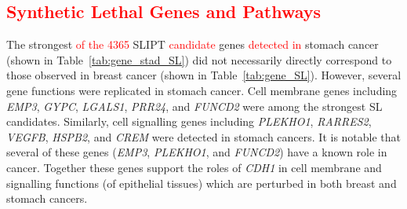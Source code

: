 \subsection{\textcolor{red}{Synthetic Lethal Genes and Pathways}} \label{chapt3:stad_SL_genes}

The strongest \textcolor{red}{of the 4365} \gls{SLIPT} \textcolor{red}{candidate} genes \textcolor{red}{detected in} stomach cancer (shown in Table~\ref{tab:gene_stad_SL}) did not necessarily directly correspond to those observed in breast cancer (shown in Table~\ref{tab:gene_SL}). However, several gene functions were replicated in stomach cancer. Cell membrane genes including \textit{EMP3}, \textit{GYPC},  \textit{LGALS1}, \textit{PRR24},  and \textit{FUNCD2} were among the strongest SL candidates. Similarly, cell signalling genes including \textit{PLEKHO1}, \textit{RARRES2}, \textit{VEGFB}, \textit{HSPB2}, and \textit{CREM} were detected in stomach cancers. It is notable that several of these genes (\textit{EMP3}, \textit{PLEKHO1}, and \textit{FUNCD2}) have a known role in cancer. Together these genes support the roles of \textit{CDH1} in cell membrane and signalling functions (of epithelial tissues) which are perturbed in both breast and stomach cancers.

